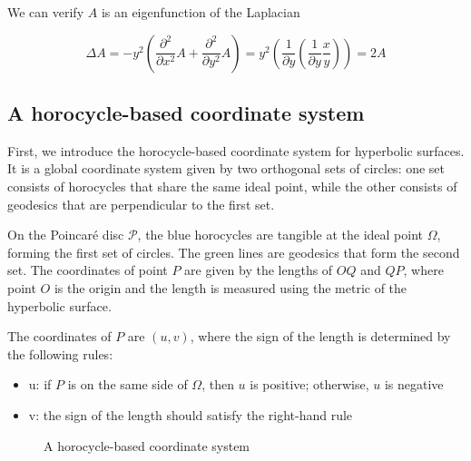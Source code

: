 We can verify $A$ is an eigenfunction of the Laplacian

$$
\Delta A = - y^2 (\frac{\partial^2}{\partial x^2} A + \frac{\partial^2}{\partial y^2} A) = y^2 (\frac{1}{\partial y} (\frac{1}{\partial y} \frac{x}{y})) = 2 A
$$

\subsection{A horocycle-based coordinate system}\label{subsec:horocyclebased}

First, we introduce the horocycle-based coordinate system for hyperbolic surfaces.
It is a global coordinate system given by two orthogonal sets of circles: one set consists of horocycles that share the same ideal point,
while the other consists of geodesics that are perpendicular to the first set.

On the Poincaré disc $\mathcal{P}$, the blue horocycles are tangible at the ideal point $\Omega$, forming the first set of circles.
The green lines are geodesics that form the second set. The coordinates of point $P$ are given by the lengths of $OQ$ and $QP$,
where point $O$ is the origin and the length is measured using the metric of the hyperbolic surface.

The coordinates of $P$ are $(u,v)$, where the sign of the length is determined by the following rules:
\begin{itemize}
\item u: if $P$ is on the same side of $\Omega$, then $u$ is positive; otherwise, $u$ is negative
\item v: the sign of the length should satisfy the right-hand rule
\end{itemize}

\begin{figure}[ht]
\centering
{}
\caption{A horocycle-based coordinate system}\label{fig:horocyclecoord}
\end{figure}

